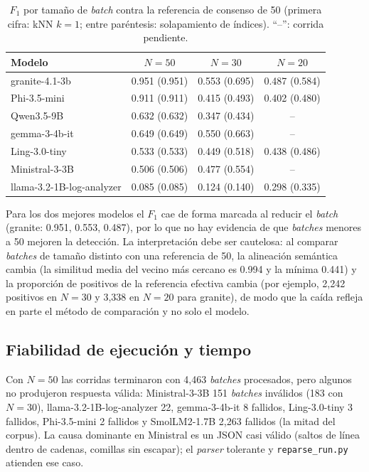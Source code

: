 \begin{table}[H]
\centering
\caption{$F_1$ por tamaño de \textit{batch} contra la referencia de consenso de 50 (primera cifra: kNN $k=1$; entre paréntesis: solapamiento de índices). ``--'': corrida pendiente.}
\label{tab:res_tamano}
\small
\begin{tabular}{@{}lccc@{}}
\toprule
\textbf{Modelo} & \textbf{$N=50$} & \textbf{$N=30$} & \textbf{$N=20$} \\
\midrule
granite-4.1-3b & 0.951 (0.951) & 0.553 (0.695) & 0.487 (0.584) \\
Phi-3.5-mini & 0.911 (0.911) & 0.415 (0.493) & 0.402 (0.480) \\
Qwen3.5-9B & 0.632 (0.632) & 0.347 (0.434) & -- \\
gemma-3-4b-it & 0.649 (0.649) & 0.550 (0.663) & -- \\
Ling-3.0-tiny & 0.533 (0.533) & 0.449 (0.518) & 0.438 (0.486) \\
Ministral-3-3B & 0.506 (0.506) & 0.477 (0.554) & -- \\
llama-3.2-1B-log-analyzer & 0.085 (0.085) & 0.124 (0.140) & 0.298 (0.335) \\
\bottomrule
\end{tabular}
\normalsize
\end{table}

Para los dos mejores modelos el $F_1$ cae de forma marcada al reducir el \textit{batch} (granite: 0.951, 0.553, 0.487), por lo que no hay evidencia de que \textit{batches} menores a 50 mejoren la detección. La interpretación debe ser cautelosa: al comparar \textit{batches} de tamaño distinto con una referencia de 50, la alineación semántica cambia (la similitud media del vecino más cercano es 0.994 y la mínima 0.441) y la proporción de positivos de la referencia efectiva cambia (por ejemplo, 2{,}242 positivos en $N=30$ y 3{,}338 en $N=20$ para granite), de modo que la caída refleja en parte el método de comparación y no solo el modelo. %

\subsection{Fiabilidad de ejecución y tiempo}\label{subsec:res_fiabilidad}

Con $N=50$ las corridas terminaron con 4{,}463 \textit{batches} procesados, pero algunos no produjeron respuesta válida: Ministral-3-3B 151 \textit{batches} inválidos (183 con $N=30$), llama-3.2-1B-log-analyzer 22, gemma-3-4b-it 8 fallidos, Ling-3.0-tiny 3 fallidos, Phi-3.5-mini 2 fallidos y SmolLM2-1.7B 2{,}263 fallidos (la mitad del corpus). La causa dominante en Ministral es un JSON casi válido (saltos de línea dentro de cadenas, comillas sin escapar); el \textit{parser} tolerante y \texttt{reparse\_run.py} atienden ese caso. %

